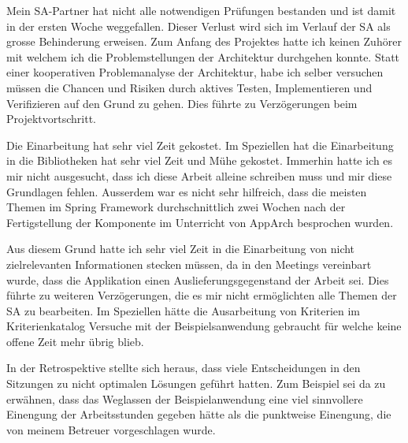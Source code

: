 Mein SA-Partner  hat nicht alle notwendigen Prüfungen bestanden und ist damit in der ersten Woche weggefallen. Dieser Verlust wird sich im Verlauf der SA als grosse Behinderung erweisen. Zum Anfang des Projektes hatte ich keinen Zuhörer mit welchem ich die Problemstellungen der Architektur durchgehen konnte. Statt einer kooperativen Problemanalyse der Architektur, habe ich selber versuchen müssen die Chancen und Risiken durch aktives Testen, Implementieren und Verifizieren auf den Grund zu gehen. Dies führte zu Verzögerungen beim Projektvortschritt.

Die Einarbeitung hat sehr viel Zeit gekostet. Im Speziellen hat die Einarbeitung in die Bibliotheken hat sehr viel Zeit und Mühe gekostet. Immerhin hatte ich es mir nicht ausgesucht, dass ich diese Arbeit alleine schreiben muss und mir diese Grundlagen fehlen. Ausserdem war es nicht sehr hilfreich, dass die meisten Themen im Spring Framework durchschnittlich zwei Wochen nach der Fertigstellung der Komponente im Unterricht von AppArch besprochen wurden. 

Aus diesem Grund hatte ich sehr viel Zeit in die Einarbeitung von nicht zielrelevanten Informationen stecken müssen, da in den Meetings vereinbart wurde, dass die Applikation einen Auslieferungsgegenstand der Arbeit sei. Dies führte zu weiteren Verzögerungen, die es mir nicht ermöglichten alle Themen der SA zu bearbeiten. Im Speziellen hätte die Ausarbeitung von Kriterien im Kriterienkatalog Versuche mit der Beispielsanwendung gebraucht für welche keine offene Zeit mehr übrig blieb.

In der Retrospektive stellte sich heraus, dass viele Entscheidungen in den Sitzungen zu nicht optimalen Lösungen geführt hatten. Zum Beispiel sei da zu erwähnen, dass das Weglassen der Beispielanwendung eine viel sinnvollere Einengung der Arbeitsstunden gegeben hätte als die punktweise Einengung, die von meinem Betreuer vorgeschlagen wurde.



